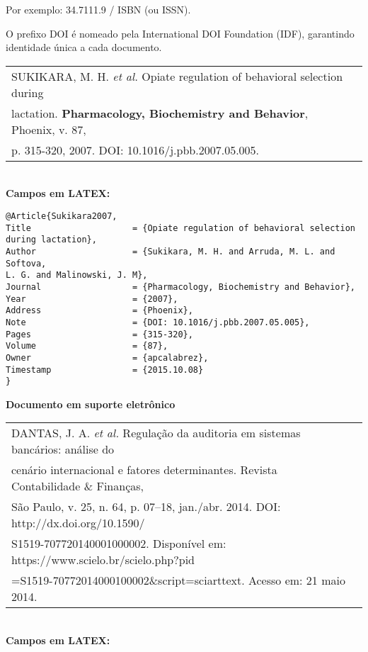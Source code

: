 Por exemplo: 34.7111.9 / ISBN (ou ISSN).

O prefixo DOI é nomeado pela International DOI Foundation (IDF),
garantindo identidade única a cada documento. \\


\begin{tabular}{|l|c|} \hline
	SUKIKARA, M. H. \textit{et al.} Opiate regulation of behavioral selection during \\lactation. \textbf{Pharmacology, Biochemistry and Behavior}, Phoenix, v. 87,\\ p. 315-320, 2007. DOI: 10.1016/j.pbb.2007.05.005. 
	\\\hline
\end{tabular} \\

\textbf{Campos em LATEX:} 

\begin{verbatim}
@Article{Sukikara2007,
Title                    = {Opiate regulation of behavioral selection 
during lactation},
Author                   = {Sukikara, M. H. and Arruda, M. L. and 
Softova,
L. G. and Malinowski, J. M},
Journal                  = {Pharmacology, Biochemistry and Behavior},
Year                     = {2007},
Address                  = {Phoenix},
Note                     = {DOI: 10.1016/j.pbb.2007.05.005},
Pages                    = {315-320},
Volume                   = {87},
Owner                    = {apcalabrez},
Timestamp                = {2015.10.08}
}
\end{verbatim}

\textbf{Documento em suporte eletrônico} 

\begin{tabular}{|l|c|} \hline
	DANTAS, J. A. \textit{et al.} Regulação da auditoria em sistemas bancários: análise do \\ cenário internacional e fatores determinantes. Revista Contabilidade \& Finanças,\\ São Paulo, v. 25, n. 64, p. 07–18, jan./abr. 2014. DOI: http://dx.doi.org/10.1590/\\S1519-707720140001000002. Disponível em: https://www.scielo.br/scielo.php?pid\\=S1519-70772014000100002\&script=sciarttext. Acesso em: 21 maio 2014.	
	\\\hline
\end{tabular} \\

\textbf{Campos em LATEX:} 


